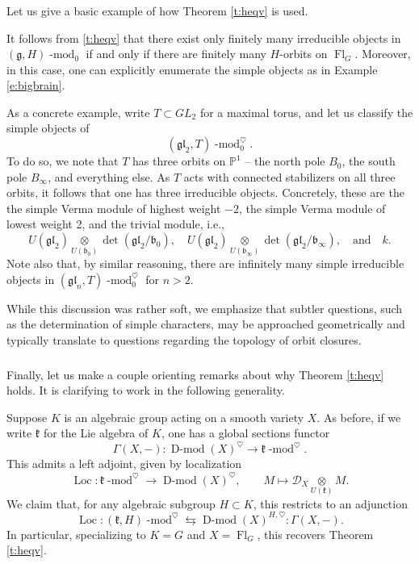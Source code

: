 \documentclass[10pt]{amsart}
\newcommand{\sB}{\on{Fl}_G}
\newcommand{\fg}{\mathfrak{g}}
\newcommand{\on}{\operatorname}
\renewcommand{\mod}{\on{-mod}}
\newcommand{\Dmod}{\on{D-mod}}
\theoremstyle{remark}
\newcommand{\fk}{\mathfrak{k}}
\newcommand{\fb}{\mathfrak{b}}
\newcommand{\sD}{\mathscr{D}}
\numberwithin{equation}{section}
\newcommand{\fgl}{\mathfrak{gl}}
\renewcommand{\mod}{\operatorname{-mod}}
\begin{document}
	

	
	\subsubsection{} Let us give a basic example of how Theorem \ref{t:heqv} is 
	used. 
	
It follows from \ref{t:heqv} that there exist only finitely 
	many irreducible objects in $(\fg, H)\mod_0$ if and only if there are 
	finitely many $H$-orbits on $\sB$. Moreover,  in this case, one can 
	explicitly enumerate the simple objects as in Example \ref{e:bigbrain}.
	
	
	
	
	
	As a concrete example,  write $T 
	\subset GL_2$ for a maximal torus, and let us classify the simple objects of
	\[
	(\fgl_2, T)\mod_0^\heartsuit. 
	\] 
	To do so, we note that $T$ has three orbits on $\mathbb{P}^1$ -- the north 
	pole $B_0$, the south pole $B_\infty$, and everything else. As $T$ acts 
	with connected 	stabilizers on all three orbits, it follows that one has 
	three irreducible objects. Concretely, these are the the simple Verma 
	module of highest weight $-2$, the simple Verma module of lowest weight 2,  
	and the trivial module, i.e., 
	\[
	      U(\fgl_2) \underset{U(\fb_0)} \otimes \det(\fgl_2/\fb_0), \quad 
	      U(\fgl_2) \underset{U(\fb_\infty)} \otimes \det(\fgl_2/\fb_\infty), 
	      \quad \text{and} \quad k. 
	\]
	Note also that, by similar reasoning, there are infinitely many simple irreducible 
	objects in $(\fgl_n, 
	T)\mod_0^\heartsuit$ for $n > 2$.  
	
	
	
	While this discussion was rather soft, we emphasize that subtler questions, 
	such as the determination of simple characters, may be approached 
	geometrically and typically translate to questions regarding the topology of orbit 
	closures.  
	
	\subsubsection{} Finally, let us make a couple orienting remarks about why 
	Theorem \ref{t:heqv} holds. It is clarifying to work in the following 
	generality. \label{s:kandx}
	
	Suppose $K$ is an algebraic group acting on a smooth variety $X$. As before, if we 
	write $\fk$ for the Lie algebra of $K$, one 
	has a global sections functor 
	\[
	   \Gamma(X, -): \Dmod(X)^\heartsuit \rightarrow \fk\mod^\heartsuit.
	\]
	This admits a left adjoint, given by localization
	\[
	   \on{Loc}: \fk\mod^\heartsuit \rightarrow \Dmod(X)^\heartsuit, \quad 
	   \quad M \mapsto \sD_X \underset{U(\fk) } \otimes M.
	\]
	We claim that, for any algebraic subgroup $H \subset K$, this restricts to an 
	adjunction 
	\begin{equation} \label{e:locadj}
	  \on{Loc}:(\fk, H)\mod^\heartsuit \leftrightarrows 
	  \Dmod(X)^{H, \heartsuit}: \Gamma(X, -).
	\end{equation}
	In particular, specializing to $K = G$ and $X = \sB$, this recovers Theorem 
	\ref{t:heqv}. 
	
\end{document}
